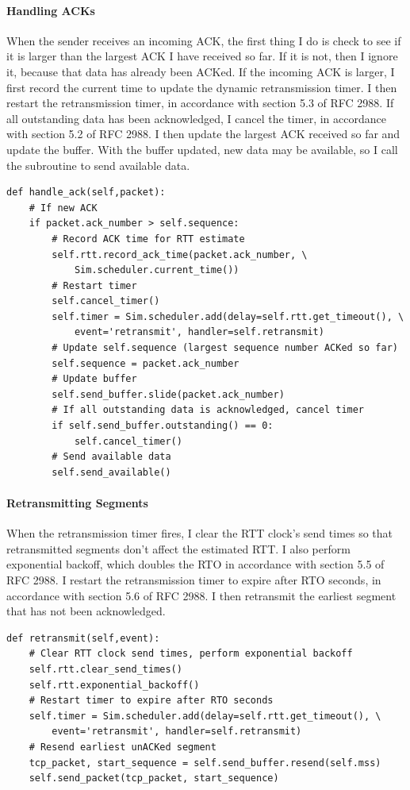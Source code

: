 \documentclass[11pt]{article}
\begin{document}
\paragraph{Handling ACKs}
When the sender receives an incoming ACK, the first thing I do is check to see if it is larger than the largest ACK I have received so far. If it is not, then I ignore it, because that data has already been ACKed. If the incoming ACK is larger, I first record the current time to update the dynamic retransmission timer. I then restart the retransmission timer, in accordance with section 5.3 of RFC 2988. If all outstanding data has been acknowledged, I cancel the timer, in accordance with section 5.2 of RFC 2988. I then update the largest ACK received so far and update the buffer. With the buffer updated, new data may be available, so I call the subroutine to send available data.
\begin{lstlisting}
def handle_ack(self,packet):
	# If new ACK
	if packet.ack_number > self.sequence:
		# Record ACK time for RTT estimate
		self.rtt.record_ack_time(packet.ack_number, \
			Sim.scheduler.current_time())
		# Restart timer
		self.cancel_timer()
		self.timer = Sim.scheduler.add(delay=self.rtt.get_timeout(), \
			event='retransmit', handler=self.retransmit)
		# Update self.sequence (largest sequence number ACKed so far)
		self.sequence = packet.ack_number
		# Update buffer
		self.send_buffer.slide(packet.ack_number)
		# If all outstanding data is acknowledged, cancel timer
		if self.send_buffer.outstanding() == 0:
			self.cancel_timer()
		# Send available data
		self.send_available()
\end{lstlisting}
\paragraph{Retransmitting Segments}
When the retransmission timer fires, I clear the RTT clock's send times so that retransmitted segments don't affect the estimated RTT. I also perform exponential backoff, which doubles the RTO in accordance with section 5.5 of RFC 2988. I restart the retransmission timer to expire after RTO seconds, in accordance with section 5.6 of RFC 2988. I then retransmit the earliest segment that has not been acknowledged.
\begin{lstlisting}
def retransmit(self,event):
	# Clear RTT clock send times, perform exponential backoff
	self.rtt.clear_send_times()
	self.rtt.exponential_backoff()
	# Restart timer to expire after RTO seconds
	self.timer = Sim.scheduler.add(delay=self.rtt.get_timeout(), \
		event='retransmit', handler=self.retransmit)
	# Resend earliest unACKed segment
	tcp_packet, start_sequence = self.send_buffer.resend(self.mss)
	self.send_packet(tcp_packet, start_sequence)
\end{lstlisting}
\pagebreak
\end{document}

